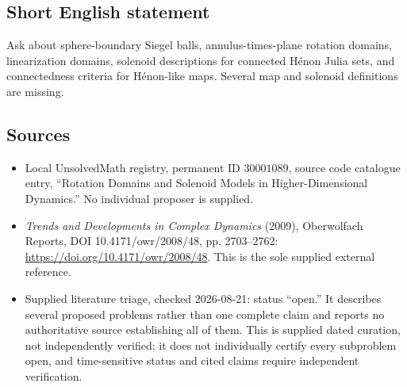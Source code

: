 \documentclass[11pt]{article}
\begin{document}
\subsection{Short English statement}
Ask about sphere-boundary Siegel balls, annulus-times-plane rotation domains, linearization domains, solenoid descriptions for connected H\'enon Julia sets, and connectedness criteria for H\'enon-like maps. Several map and solenoid definitions are missing.
\subsection{Sources}
\begin{itemize}
\item Local UnsolvedMath registry, permanent ID \(30001089\), source code catalogue entry, ``Rotation Domains and Solenoid Models in Higher-Dimensional Dynamics.'' No individual proposer is supplied.
\item \emph{Trends and Developments in Complex Dynamics} (2009), Oberwolfach Reports, DOI 10.4171/owr/2008/48, pp. 2703--2762: \url{https://doi.org/10.4171/owr/2008/48}. This is the sole supplied external reference.
\item Supplied literature triage, checked 2026-08-21: status ``open.'' It describes several proposed problems rather than one complete claim and reports no authoritative source establishing all of them. This is supplied dated curation, not independently verified; it does not individually certify every subproblem open, and time-sensitive status and cited claims require independent verification.
\end{itemize}
\end{document}
